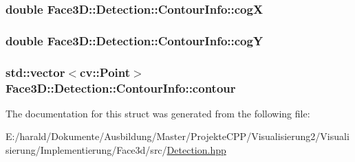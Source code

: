 \subsubsection[{\texorpdfstring{cogX}{cogX}}]{\setlength{\rightskip}{0pt plus 5cm}double Face3\+D\+::\+Detection\+::\+Contour\+Info\+::cogX}\hypertarget{struct_face3_d_1_1_detection_1_1_contour_info_ab3b12cdb015852630da5d8dce2f293ee}{}\label{struct_face3_d_1_1_detection_1_1_contour_info_ab3b12cdb015852630da5d8dce2f293ee}
\subsubsection[{\texorpdfstring{cogY}{cogY}}]{\setlength{\rightskip}{0pt plus 5cm}double Face3\+D\+::\+Detection\+::\+Contour\+Info\+::cogY}\hypertarget{struct_face3_d_1_1_detection_1_1_contour_info_ad7c5269ab9a7fa7b968d6d4d6311ede0}{}\label{struct_face3_d_1_1_detection_1_1_contour_info_ad7c5269ab9a7fa7b968d6d4d6311ede0}
\subsubsection[{\texorpdfstring{contour}{contour}}]{\setlength{\rightskip}{0pt plus 5cm}std\+::vector$<$cv\+::\+Point$>$ Face3\+D\+::\+Detection\+::\+Contour\+Info\+::contour}\hypertarget{struct_face3_d_1_1_detection_1_1_contour_info_a758e6ad092c81d6c8b9e25bc35f07e53}{}\label{struct_face3_d_1_1_detection_1_1_contour_info_a758e6ad092c81d6c8b9e25bc35f07e53}


The documentation for this struct was generated from the following file\+:\begin{DoxyCompactItemize}
\item 
E\+:/harald/\+Dokumente/\+Ausbildung/\+Master/\+Projekte\+C\+P\+P/\+Visualisierung2/\+Visualisierung/\+Implementierung/\+Face3d/src/\hyperlink{_detection_8hpp}{Detection.\+hpp}\end{DoxyCompactItemize}
